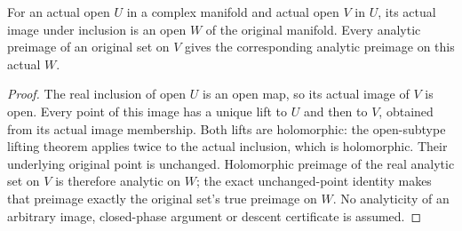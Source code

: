\begin{lemma}
\label{hir:general-three-nested-open-analytic-transfer}
\leanok
For an actual open $U$ in a complex manifold and actual open $V$ in
$U$, its actual image under inclusion is an open $W$ of the original
manifold. Every analytic preimage of an original set on $V$ gives
the corresponding analytic preimage on this actual $W$.
\end{lemma}
\begin{proof}
The real inclusion of open $U$ is an open map, so its actual image of
$V$ is open. Every point of this image has a unique lift to $U$ and
then to $V$, obtained from its actual image membership. Both lifts
are holomorphic: the open-subtype lifting theorem applies twice to
the actual inclusion, which is holomorphic. Their underlying original
point is unchanged. Holomorphic preimage of the real analytic set on
$V$ is therefore analytic on $W$; the exact unchanged-point identity
makes that preimage exactly the original set's true preimage on $W$.
No analyticity of an arbitrary image, closed-phase argument or descent
certificate is assumed.
\end{proof}


